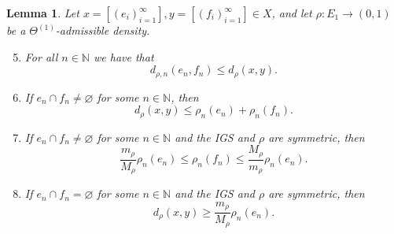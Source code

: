 \documentclass{amsart}
\newtheorem{lemma}[equation]{Lemma}
\numberwithin{equation}{section}
\theoremstyle{definition}
\theoremstyle{remark}
\newcommand{\N}{\mathbb{N}}
\begin{document}
\begin{lemma}\label{Lemma: Distance Lemma 2}
    Let \(x=[(e_i)_{i=1}^\infty],y=[(f_i)_{i=1}^\infty]\in X\), and let \(\rho\colon E_1\to (0,1)\) be a \(\Theta^{(1)}\)-admissible density.
    \begin{enumerate}[label={\color{blue}{\textup{$($DL\arabic*}$)$}}, widest=a, leftmargin=*]\setcounter{enumi}{4}
        \item\label{Lemma: DL(5)} For all \(n\in \N\) we have that
            \[
                d_{\rho,n}(e_n,f_n)\leq d_\rho(x,y).
            \]
        \item\label{Lemma: DL(6)} If \(e_n\cap f_n\neq \varnothing\) for some \(n\in\N\), then
            \[
                d_{\rho}(x,y)\leq \rho_n(e_n)+\rho_n(f_n).
            \]
        \item\label{Lemma: DL(7)} If \(e_n\cap f_n\neq \varnothing\) for some \(n\in\N\) and the IGS and \(\rho\) are symmetric, then
            \[
                \frac{m_\rho}{M_\rho}\rho_n(e_n) \leq \rho_n(f_n) \leq \frac{M_\rho}{m_\rho}\rho_n(e_n).
            \]
        \item\label{Lemma: DL(8)} If \(e_n\cap f_n= \varnothing\) for some \(n\in\N\) and the IGS and \(\rho\) are symmetric, then
            \[
                d_\rho(x,y)\geq\frac{m_\rho}{M_\rho}\rho_n(e_n).
            \]
    \end{enumerate}
\end{lemma}
\end{document}
